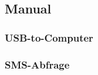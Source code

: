 \subsection{Manual}
\label{subsec:manual}

\subsubsection{USB-to-Computer}
\label{subsubsec:usbtocomputer}

\subsubsection{SMS-Abfrage}
\label{subsubsec:smsAbrage}